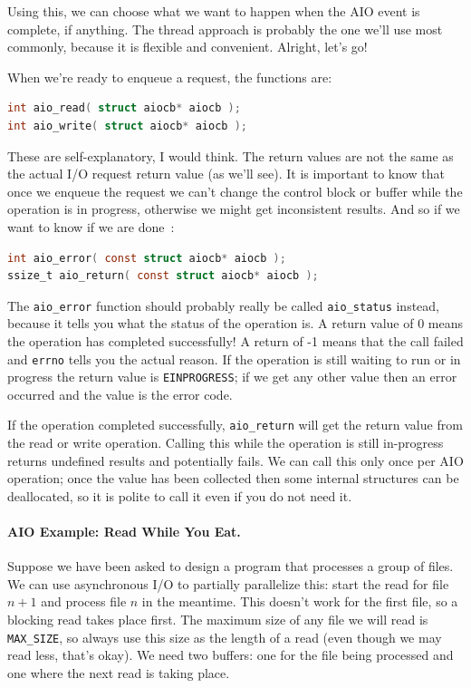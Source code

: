 Using this, we can choose what we want to happen when the AIO event is complete, if anything. The thread approach is probably the one we'll use most commonly, because it is flexible and convenient. Alright, let's go!

When we're ready to enqueue a request, the functions are:
\begin{lstlisting}[language=C]
int aio_read( struct aiocb* aiocb );
int aio_write( struct aiocb* aiocb );
\end{lstlisting}

These are self-explanatory, I would think. The return values are not the same as the actual I/O request return value (as we'll see). It is important to know that once we enqueue the request we can't change the control block or buffer while the operation is in progress, otherwise we might get inconsistent results. And so if we want to know if we are done~\cite{apunix}:

\begin{lstlisting}[language=C]
int aio_error( const struct aiocb* aiocb );
ssize_t aio_return( const struct aiocb* aiocb );
\end{lstlisting}

The \texttt{aio\_error} function should probably really be called \texttt{aio\_status} instead, because it tells you what the status of the operation is. A return value of 0 means the operation has completed successfully! A return of -1 means that the call failed and \texttt{errno} tells you the actual reason. If the operation is still waiting to run or in progress the return value is \texttt{EINPROGRESS}; if we get any other value then an error occurred and the value is the error code.

If the operation completed successfully, \texttt{aio\_return} will get the return value from the read or write operation. Calling this while the operation is still in-progress returns undefined results and potentially fails. We can call this only once per AIO operation; once the value has been collected then some internal structures can be deallocated, so it is polite to call it even if you do not need it.

\paragraph{AIO Example: Read While You Eat.}

Suppose we have been asked to design a program that processes a group of files. We can use asynchronous I/O to partially parallelize this: start the read for file $n+1$ and process file $n$ in the meantime. This doesn't work for the first file, so a blocking read takes place first. The maximum size of any file we will read is \texttt{MAX\_SIZE}, so always use this size as the length of a read (even though we may read less, that's okay). We need two buffers: one for the file being processed and one where the next read is taking place.

